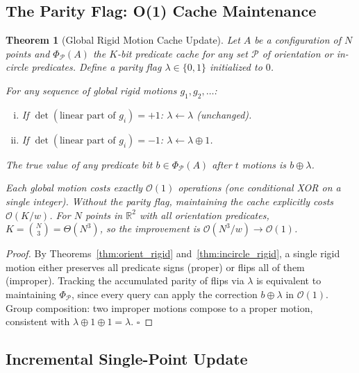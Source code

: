 \documentclass[11pt,letterpaper]{article}
\newtheorem{theorem}{Theorem}[section]
\newcommand{\RR}{\mathbb{R}}
\newcommand{\PhiP}{\Phi_{\mathcal{P}}}
\newcommand{\cP}{\mathcal{P}}
\newcommand{\cO}{\mathcal{O}}
\newcommand{\wt}{w}       %
\begin{document}
\subsection{The Parity Flag: O(1) Cache Maintenance}

\begin{thmbox}
\begin{theorem}[Global Rigid Motion Cache Update]\label{thm:cache}
Let $A$ be a configuration of $N$ points and $\PhiP(A)$ the $K$-bit predicate cache
for any set $\cP$ of orientation or in-circle predicates.  Define a \emph{parity flag}
$\lambda\in\{0,1\}$ initialized to $0$.

For any sequence of global rigid motions $g_1,g_2,\dots$:
\begin{enumerate}[(i)]
\item If $\det(\text{linear part of }g_i)=+1$: $\lambda\leftarrow\lambda$ (unchanged).
\item If $\det(\text{linear part of }g_i)=-1$: $\lambda\leftarrow\lambda\oplus 1$.
\end{enumerate}
The true value of any predicate bit $b\in\PhiP(A)$ after $t$ motions is $b\oplus\lambda$.

Each global motion costs exactly $\cO(1)$ operations (one conditional XOR on a single
integer).  Without the parity flag, maintaining the cache explicitly costs $\cO(K/\wt)$.
For $N$ points in $\RR^2$ with all orientation predicates, $K=\binom{N}{3}=\Theta(N^3)$,
so the improvement is $\cO(N^3/\wt)\to\cO(1)$.
\end{theorem}
\end{thmbox}

\begin{proof}
By Theorems~\ref{thm:orient_rigid} and~\ref{thm:incircle_rigid}, a single rigid motion
either preserves all predicate signs (proper) or flips all of them (improper).
Tracking the accumulated parity of flips via $\lambda$ is equivalent to maintaining
$\PhiP$, since every query can apply the correction $b\oplus\lambda$ in $\cO(1)$.
Group composition: two improper motions compose to a proper motion, consistent with
$\lambda\oplus1\oplus1=\lambda$.  $\square$
\end{proof}

\subsection{Incremental Single-Point Update}
\end{document}
